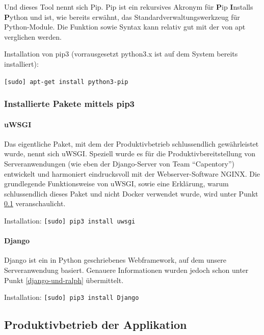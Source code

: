 Und dieses Tool nennt sich Pip. Pip ist ein rekursives Akronym für
\textbf{P}ip \textbf{I}nstalls \textbf{P}ython und ist, wie bereits
erwähnt, das Standardverwaltungswerkzeug für Python-Module. Die Funktion
sowie Syntax kann relativ gut mit der von apt verglichen werden.

Installation von pip3 (vorrausgesetzt python3.x ist auf dem System
bereits installiert):

\texttt{{[}sudo{]}\ apt-get\ install\ python3-pip}

\hypertarget{installierte-pakete-mittels-pip3}{%
\subsubsection{Installierte Pakete mittels
pip3}\label{installierte-pakete-mittels-pip3}}

\hypertarget{uwsgi}{%
\paragraph{uWSGI}\label{uwsgi}}

Das eigentliche Paket, mit dem der Produktivbetrieb schlussendlich
gewährleistet wurde, nennt sich uWSGI. Speziell wurde es für die
Produktivbereitstellung von Serveranwendungen (wie eben der
Django-Server von Team ``Capentory'') entwickelt und harmoniert
eindrucksvoll mit der Webserver-Software NGINX. Die grundlegende
Funktionsweise von uWSGI, sowie eine Erklärung, warum schlussendlich
dieses Paket und nicht Docker verwendet wurde, wird unter Punkt
\ref{produktivbetrieb-der-applikation} veranschaulicht.

Installation: \texttt{{[}sudo{]}\ pip3\ install\ uwsgi}

\hypertarget{django}{%
\paragraph{Django}\label{django}}

Django ist ein in Python geschriebenes Webframework, auf dem unsere
Serveranwendung basiert. Genauere Informationen wurden jedoch schon
unter Punkt \ref{django-und-ralph} übermittelt.

Installation: \texttt{{[}sudo{]}\ pip3\ install\ Django}

\hypertarget{produktivbetrieb-der-applikation}{%
\subsection{Produktivbetrieb der
Applikation}\label{produktivbetrieb-der-applikation}}

